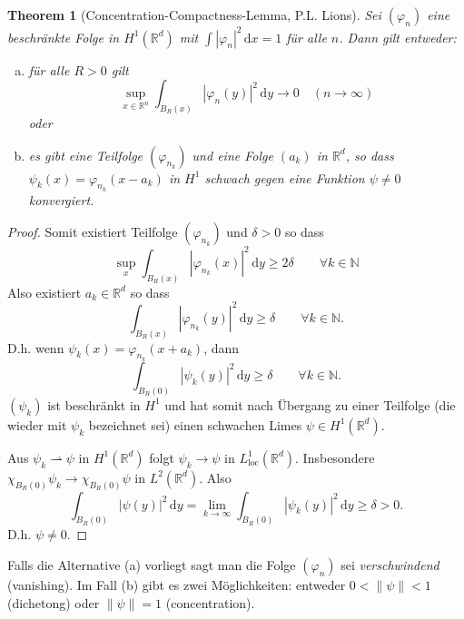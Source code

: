 \documentclass[
paper=a4,
bibtotocnumbered,
liststotocnumbered,
tablecaptionabove,
pointlessnumbers,
twoside,
openright,
10pt
]
{report}
\let\phi\varphi
\newtheorem{thm}{Theorem}[chapter]
\theoremstyle{definition}
\numberwithin{equation}{chapter}
\begin{document}
\begin{thm}[Concentration-Compactness-Lemma, P.L. Lions] \label{5.9}
Sei $(\phi_n)$ eine beschränkte Folge in $H^1(\mathbb R^d)$ mit $\int |\phi_n|^2\, \mathrm dx =1$ für alle $n$. Dann gilt entweder:
\begin{enumerate}[(a)]
\item für alle $R>0$ gilt
\begin{equation}
\sup_{x\in \mathbb R^n} \int_{B_R(x)} |\phi_n(y)|^2\, \mathrm dy \to 0 \quad (n\to \infty)
\end{equation}
oder
\item es gibt eine Teilfolge $(\phi_{n_k})$ und eine Folge $(a_k)$ in $\mathbb R^d$, so dass $\psi_k(x) = \phi_{n_k} (x-a_k)$ in $H^1$ schwach gegen eine Funktion $\psi\neq 0$ konvergiert. 
\end{enumerate}
\end{thm}
\begin{proof}
Somit existiert Teilfolge $(\phi_{n_k})$ und $\delta >0$ so dass
\begin{equation}
\sup_x \int_{B_R(x)} |\phi_{n_k}(x)|^2\, \mathrm dy \ge 2\delta \qquad \forall k\in \mathbb N
\end{equation}
Also existiert $a_k\in \mathbb R^d$ so dass
\begin{equation}
\int_{B_R(x)} |\phi_{n_k}(y)|^2\, \mathrm dy \ge \delta \qquad \forall k \in \mathbb N.
\end{equation}
D.h. wenn $\psi_k(x) = \phi_{n_k} (x+a_k)$, dann 
\begin{equation}
\int_{B_R(0)} |\psi_k(y)|^2\, \mathrm dy \ge \delta \qquad \forall k\in \mathbb N.
\end{equation}
$(\psi_k)$ ist beschränkt in $H^1$ und hat somit nach Übergang zu einer Teilfolge (die wieder mit $\psi_k$ bezeichnet sei) einen schwachen Limes $\psi\in H^1(\mathbb R^d)$.

Aus $\psi_k \rightharpoonup \psi$ in $H^1(\mathbb R^d)$ folgt $\psi_k \to \psi$ in $L^1_{\text{loc}}(\mathbb R^d)$. Insbesondere $\chi_{B_R(0)} \psi_k \to \chi_{B_R(0)} \psi$ in $L^2(\mathbb R^d)$. Also
\begin{equation}
\int_{B_R(0)} |\psi(y)|^2\, \mathrm dy = \lim_{k\to \infty} \int_{B_R(0)} |\psi_k(y)|^2 \, \mathrm dy \ge \delta >0.
\end{equation}
D.h. $\psi \neq 0$.
\end{proof}

Falls die Alternative (a) vorliegt sagt man die Folge $(\phi_n)$ sei \emph{verschwindend} (vanishing). Im Fall (b) gibt es zwei Möglichkeiten:
entweder $0< \|\psi\|<1$ (dichetong) oder $\| \psi\|=1$ (concentration).
\end{document}

